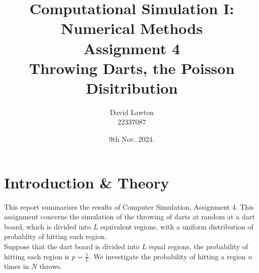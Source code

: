 \documentclass{article}
\title{Computational Simulation I: Numerical Methods\\Assignment 4\\Throwing Darts, the Poisson Disitribution}
\author{David Lawton\\22337087}
\date{9th Nov. 2024.}
\theoremstyle{definition}
\theoremstyle{remark}
\begin{document}
\maketitle

\tableofcontents

\section{Introduction \& Theory}
This report summarises the results of Computer Simulation, Assignment 4. This assignment concerns the simulation of the throwing of darts at random at a dart board, which is divided into $L$ equivalent regions, with a uniform distribution of probablity of hitting each region.\\
\indent Suppose that the dart board is divided into $L$ equal regions, the probability of hitting each region is $p = \frac{1}{L}$. We investigate the probability of hitting a region $n$ times in $N$ throws.\\
\end{document}
